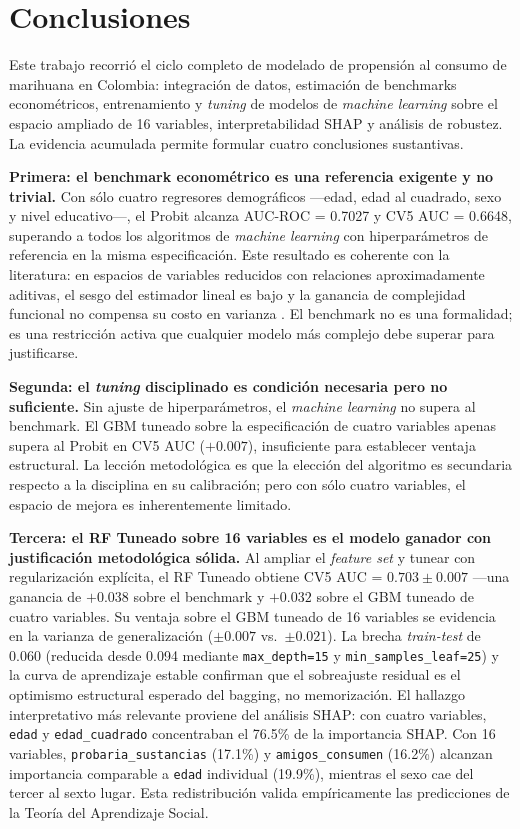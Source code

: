 \documentclass[12pt, a4paper]{article}
\newcommand{\citep}[1]{\cite{#1}}
\begin{document}
\section{Conclusiones}

Este trabajo recorrió el ciclo completo de modelado de propensión al consumo de marihuana en Colombia: integración de datos, estimación de benchmarks econométricos, entrenamiento y \textit{tuning} de modelos de \textit{machine learning} sobre el espacio ampliado de 16 variables, interpretabilidad SHAP y análisis de robustez. La evidencia acumulada permite formular cuatro conclusiones sustantivas.

\textbf{Primera: el benchmark econométrico es una referencia exigente y no trivial.} Con sólo cuatro regresores demográficos —edad, edad al cuadrado, sexo y nivel educativo—, el Probit alcanza AUC-ROC = 0.7027 y CV5 AUC = 0.6648, superando a todos los algoritmos de \textit{machine learning} con hiperparámetros de referencia en la misma especificación. Este resultado es coherente con la literatura: en espacios de variables reducidos con relaciones aproximadamente aditivas, el sesgo del estimador lineal es bajo y la ganancia de complejidad funcional no compensa su costo en varianza \citep{informal:hastie}. El benchmark no es una formalidad; es una restricción activa que cualquier modelo más complejo debe superar para justificarse.

\textbf{Segunda: el \textit{tuning} disciplinado es condición necesaria pero no suficiente.} Sin ajuste de hiperparámetros, el \textit{machine learning} no supera al benchmark. El GBM tuneado sobre la especificación de cuatro variables apenas supera al Probit en CV5 AUC ($+0.007$), insuficiente para establecer ventaja estructural. La lección metodológica es que la elección del algoritmo es secundaria respecto a la disciplina en su calibración; pero con sólo cuatro variables, el espacio de mejora es inherentemente limitado.

\textbf{Tercera: el RF Tuneado sobre 16 variables es el modelo ganador con justificación metodológica sólida.} Al ampliar el \textit{feature set} y tunear con regularización explícita, el RF Tuneado obtiene CV5 AUC = $\mathbf{0.703} \pm 0.007$ —una ganancia de $+0.038$ sobre el benchmark y $+0.032$ sobre el GBM tuneado de cuatro variables. Su ventaja sobre el GBM tuneado de 16 variables se evidencia en la varianza de generalización ($\pm 0.007$ vs.\ $\pm 0.021$). La brecha \textit{train-test} de 0.060 (reducida desde 0.094 mediante \texttt{max\_depth=15} y \texttt{min\_samples\_leaf=25}) y la curva de aprendizaje estable confirman que el sobreajuste residual es el optimismo estructural esperado del bagging, no memorización. El hallazgo interpretativo más relevante proviene del análisis SHAP: con cuatro variables, \texttt{edad} y \texttt{edad\_cuadrado} concentraban el 76.5\% de la importancia SHAP. Con 16 variables, \texttt{probaria\_sustancias} (17.1\%) y \texttt{amigos\_consumen} (16.2\%) alcanzan importancia comparable a \texttt{edad} individual (19.9\%), mientras el sexo cae del tercer al sexto lugar. Esta redistribución valida empíricamente las predicciones de la Teoría del Aprendizaje Social.
\end{document}

